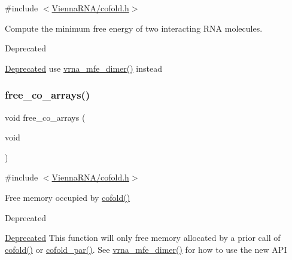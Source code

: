 {\ttfamily \#include $<$\hyperlink{cofold_8h}{Vienna\+R\+N\+A/cofold.\+h}$>$}



Compute the minimum free energy of two interacting R\+NA molecules. 

\begin{DoxyRefDesc}{Deprecated}
\item[\hyperlink{deprecated__deprecated000031}{Deprecated}]use \hyperlink{group__mfe__cofold_gaab22d10c1190f205f16a77cab9d5d3ee}{vrna\+\_\+mfe\+\_\+dimer()} instead\end{DoxyRefDesc}
\mbox{\label{group__mfe__cofold_gaafb33d7473eb9af9d1b168ca8761c41a}} 
\subsubsection{\texorpdfstring{free\+\_\+co\+\_\+arrays()}{free\_co\_arrays()}}
{\footnotesize\ttfamily void free\+\_\+co\+\_\+arrays (\begin{DoxyParamCaption}\item[{void}]{ }\end{DoxyParamCaption})}



{\ttfamily \#include $<$\hyperlink{cofold_8h}{Vienna\+R\+N\+A/cofold.\+h}$>$}



Free memory occupied by \hyperlink{group__mfe__cofold_gabc8517f22cfe70595ee81fc837910d52}{cofold()} 

\begin{DoxyRefDesc}{Deprecated}
\item[\hyperlink{deprecated__deprecated000032}{Deprecated}]This function will only free memory allocated by a prior call of \hyperlink{group__mfe__cofold_gabc8517f22cfe70595ee81fc837910d52}{cofold()} or \hyperlink{group__mfe__cofold_ga7612cfeeb1b793f1e4179b1eb53df1f3}{cofold\+\_\+par()}. See \hyperlink{group__mfe__cofold_gaab22d10c1190f205f16a77cab9d5d3ee}{vrna\+\_\+mfe\+\_\+dimer()} for how to use the new A\+PI\end{DoxyRefDesc}


